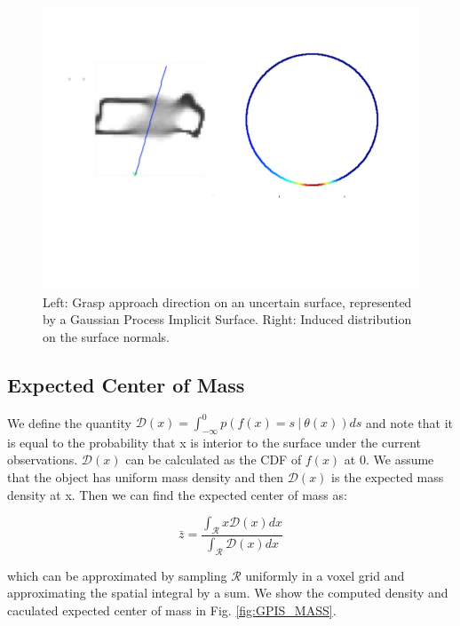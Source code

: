 \documentclass[letterpaper, 10 pt, conference]{ieeeconf}  %
\begin{document}
\begin{figure}[ht!]
\centering
\includegraphics[scale = 0.3]{figures/Slide5.jpg}
\caption{Left: Grasp approach direction on an uncertain surface, represented by a Gaussian Process Implicit Surface.
Right: Induced distribution on the surface normals.}
\vspace*{-10pt}
\label{fig:GraspSurfaceNormals}
\end{figure}

\subsection{Expected Center of Mass} 

We define the quantity $\mathcal{D}(x) = \int_{-\infty}^{0} p(f(x) =  s \ | \ \theta(x)) ds$ and note that it is equal to the probability that x is interior to the surface under the current observations.
$\mathcal{D}(x)$ can be calculated as the CDF of $f(x)$ at $0$.
We assume that the object has uniform mass density and then $\mathcal{D}(x)$ is the expected mass density at x.
Then we can find the expected center of mass as:

\begin{equation}
  \bar{z} 
  =
  \frac
    {\int_{\mathcal{R}}x \mathcal{D}(x) dx}
    {\int_{\mathcal{R}}  \mathcal{D}(x) dx}
\end{equation}

which can be approximated by sampling $\mathcal{R}$ uniformly in a voxel grid and approximating the spatial integral by a sum. We show the computed density and caculated expected center of mass in Fig. \ref{fig:GPIS_MASS}.
\end{document}
